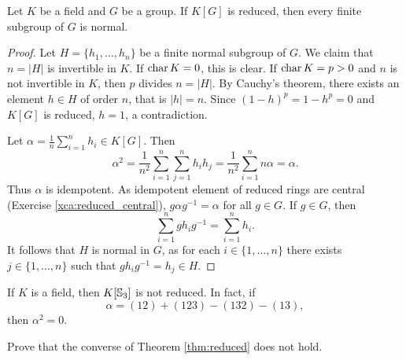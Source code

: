 \begin{theorem}
\label{thm:reduced}
    Let $K$ be a field and $G$ be a group. If $K[G]$
    is reduced, then every finite subgroup of $G$ is normal. 
\end{theorem}

\begin{proof}
    Let $H=\{h_1,\dots,h_n\}$ be a finite normal subgroup of $G$. 
    We claim that $n=|H|$ is invertible in $K$. If $\operatorname{char} K=0$, this 
    is clear. If $\operatorname{char} K=p>0$ and $n$ is not invertible in $K$, 
    then $p$ divides $n=|H|$. By Cauchy's theorem, 
    there exists an element $h\in H$ of order $n$, that is 
    $|h|=n$. Since $(1-h)^p=1-h^p=0$ and $K[G]$ is reduced,
    $h=1$, a contradiction. 
    
    Let $\alpha=\frac{1}{n}\sum_{i=1}^nh_i\in K[G]$. Then
    \[
    \alpha^2=\frac{1}{n^2}\sum_{i=1}^n\sum_{j=1}^nh_ih_j
    =\frac{1}{n^2}\sum_{i=1}^nn\alpha=\alpha.
    \]
    Thus $\alpha$ is idempotent. As idempotent 
    element of reduced rings are central (Exercise \ref{xca:reduced_central}), 
    $g\alpha g^{-1}=\alpha$ for all $g\in G$. If $g\in G$, 
    then 
    \[
    \sum_{i=1}^n gh_ig^{-1}=\sum_{i=1}^n h_i.
    \]
    It follows that $H$ is normal in $G$, 
    as for each $i\in\{1,\dots,n\}$ 
    there exists $j\in\{1,\dots,n\}$ such that 
    $gh_ig^{-1}=h_j\in H$. 
\end{proof}

\begin{example}
    If $K$ is a field, then $K[\mathbb{S}_3]$ is not reduced. 
    In fact, 
    if 
    \[
    \alpha=(12)+(123)-(132)-(13),
    \]
    then 
    $\alpha^2=0$. 
\end{example}

\begin{exercise}
    Prove that the converse of Theorem \ref{thm:reduced} 
    does not hold. 
\end{exercise}


